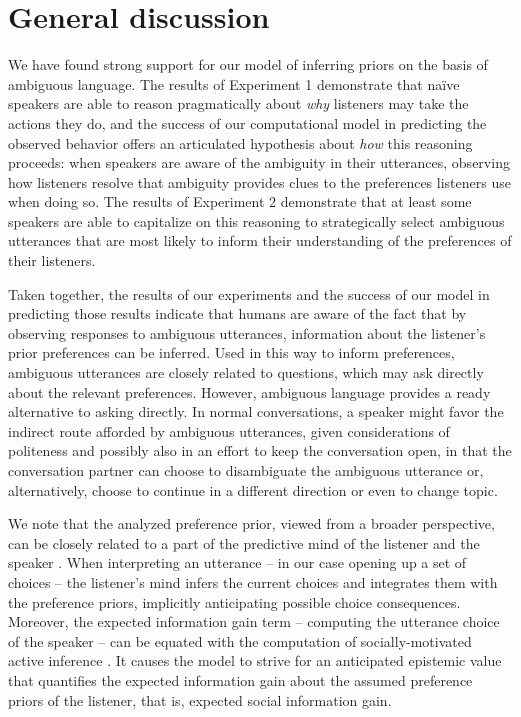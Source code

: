 \documentclass[10pt,a4paper]{article}
\newcommand{\gcs}[1]{\textcolor{blue}{[gcs: #1]}}
\begin{document}
\section{General discussion}

We have found strong support for our model of inferring priors on the basis of ambiguous language.
The results of Experiment 1 demonstrate that na\"ive speakers are able to reason pragmatically about \emph{why} listeners may take the actions they do, and the success of our computational model in predicting the observed behavior offers an articulated hypothesis about \emph{how} this reasoning proceeds: when speakers are aware of the ambiguity in their utterances, observing how listeners resolve that ambiguity provides clues to the preferences listeners use when doing so.
The results of Experiment 2 demonstrate that at least some speakers are able to capitalize on this reasoning to strategically select ambiguous utterances that are most likely to inform their understanding of the preferences of their listeners.

Taken together, the results of our experiments and the success of our model in predicting those results indicate that humans are aware of the fact that by observing responses to ambiguous utterances, information about the listener's prior preferences can be inferred. 
Used in this way to inform preferences, ambiguous utterances are closely related to questions, which may ask directly about the  relevant preferences. 
However, ambiguous language provides a ready alternative to asking directly. In normal conversations, a speaker might favor the indirect route afforded by ambiguous utterances, given considerations of politeness and possibly also in an effort to keep the conversation open, in that the conversation partner can choose to disambiguate the ambiguous utterance or, alternatively, choose to continue in a different direction or even to change topic.


We note that the analyzed preference prior, viewed from a broader perspective, can be closely related to a part of the predictive mind of the listener and the speaker \cite{Butz:2016,Butz:2017}. 
When interpreting an utterance -- in our case opening up a set of choices -- the listener's mind infers the current choices and integrates them with the preference priors, implicitly anticipating possible choice consequences.
Moreover, the expected information gain term -- computing the utterance choice of the speaker -- can be equated with the computation of socially-motivated active inference \cite{Butz:2017a,Friston:2015}.
It causes the model to strive for an anticipated epistemic value that quantifies the expected information gain about the assumed preference priors of the listener, that is, expected social information gain. 
\end{document}
